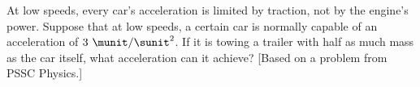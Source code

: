 At low speeds, every car's acceleration is limited by traction, not by the
        engine's power.
        Suppose that at low speeds, a certain car is normally capable of an acceleration of $3\ \munit/\sunit^2$. 
        If it is towing a trailer with half as much mass as the car
        itself, what acceleration can it achieve? [Based on a
        problem from PSSC Physics.]
